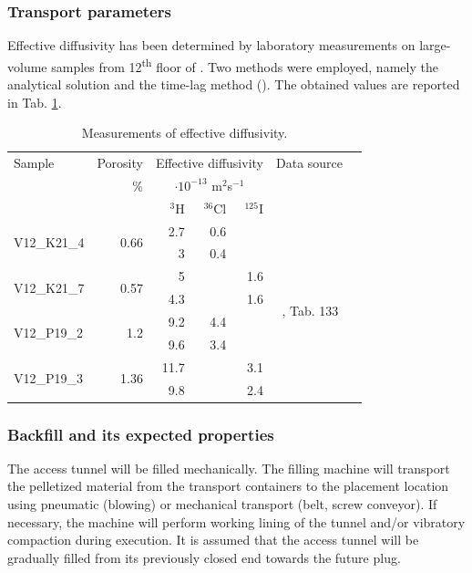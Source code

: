 \subsubsection{Transport parameters}
\label{sec:review_diffusion}
Effective diffusivity has been determined by laboratory measurements on
large-volume samples from 12\textsuperscript{th} floor of \URFBI. Two methods
were employed, namely the analytical solution and the time-lag method
(\cite{tz_hh}).
The obtained values are reported in Tab. \ref{tab:diffusivity}.

\begin{table}[!htp]\centering
\caption{Measurements of effective diffusivity.}\label{tab:diffusivity}
\scriptsize
\begin{tabular}{lrrrrrr}\toprule
Sample &Porosity &\multicolumn{3}{c}{Effective diffusivity} &Data source \\
&\% &\multicolumn{3}{c}{$\cdot10^{-13}$ m${}^2$s${}^{-1}$} & \\\midrule
& &${}^3$H &${}^{36}$Cl &${}^{125}$I & \\
\midrule
\multirow{2}{*}{V12\_K21\_4} &\multirow{2}{*}{0.66} &2.7 &0.6 & &\multirow{8}{*}{\cite{tz_hh}, Tab. 133 $ $} \\
& &3 &0.4 & & \\\cmidrule{1-5}
\multirow{2}{*}{V12\_K21\_7} &\multirow{2}{*}{0.57} &5 & &1.6 & \\
& &4.3 & &1.6 & \\\cmidrule{1-5}
\multirow{2}{*}{V12\_P19\_2} &\multirow{2}{*}{1.2} &9.2 &4.4 & & \\
& &9.6 &3.4 & & \\\cmidrule{1-5}
\multirow{2}{*}{V12\_P19\_3} &\multirow{2}{*}{1.36} &11.7 & &3.1 & \\
& &9.8 & &2.4 & \\
\bottomrule
\end{tabular}
\end{table}

\subsubsection{Backfill and its expected properties}

The access tunnel will be filled mechanically. The filling machine will
transport the pelletized material from the transport containers to the
placement location using pneumatic (blowing) or mechanical transport (belt,
screw conveyor). If necessary, the machine will perform working lining of the
tunnel and/or vibratory compaction during execution. It is assumed that the
access tunnel will be gradually filled from its previously closed end towards
the future plug.

